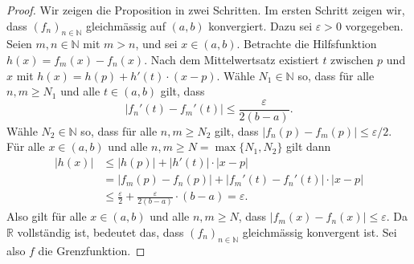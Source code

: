 \documentclass[../main.tex]{subfiles}
\begin{document}
\begin{proof}
  Wir zeigen die Proposition in zwei Schritten. Im ersten Schritt zeigen wir,
  dass ${(f_{n})}_{n \in \mathbb{N}}$ gleichmässig auf $(a, b)$ konvergiert.
  Dazu sei $\varepsilon > 0$ vorgegeben. Seien $m, n \in \mathbb{N}$ 
  mit $m > n$, und sei $x \in (a, b)$.
  Betrachte die Hilfsfunktion
  \(
    h(x) = f_m(x) - f_n(x)
  \).
  Nach dem Mittelwertsatz existiert $ t$ zwischen $p$ und $x$ mit
  $h(x) =  h(p) + h'(t) \cdot (x - p)$.
  Wähle $N_1 \in \mathbb{N}$ so, dass für alle $n , m \geq N_1$ und
  alle $t \in (a, b)$ gilt, dass
  \[
  |f_n'(t) - f_m'(t)| \leq \frac{\varepsilon }{2(b-a)}.
  \]
  Wähle $N_2 \in \mathbb{N}$ so, dass für alle $n , m \geq N_2$ gilt,
  dass
  \(
    |f_n(p) - f_m(p)| \leq \varepsilon/2
  \).
  Für alle $x \in (a, b)$ und alle $n, m \geq N = \max\{N_1, N_2\}$ gilt dann
   \begin{align*}
     |h(x)| 
     &\leq |h(p)| + |h'(t)| \cdot |x - p|  \\
     &= |f_m(p) - f_n(p)| + |f_m'(t) - f_n'(t)| \cdot |x - p| \\
     & \leq \frac{\varepsilon}{2} + \frac{\varepsilon}{2(b-a)}\cdot (b-a) = \varepsilon.
  \end{align*}
  Also gilt für alle $x \in (a, b)$ und alle $n, m \geq N$, dass
  $|f_m(x) - f_n(x)| \leq \varepsilon$. Da $\mathbb{R}$ vollständig ist,
  bedeutet das, dass ${(f_{n})}_{n \in \mathbb{N}}$ gleichmässig konvergent ist.
  Sei also $f$ die Grenzfunktion.
  

\end{proof}
\end{document}
